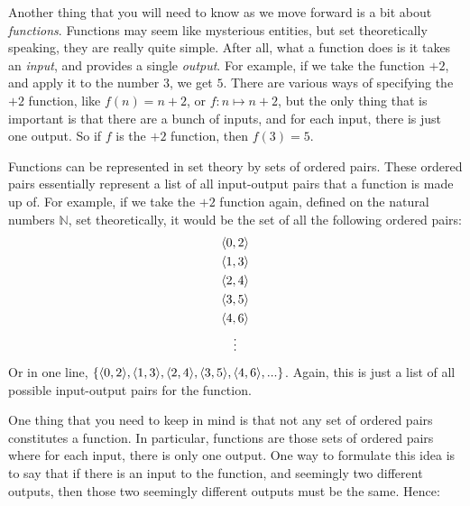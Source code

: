 Another thing that you will need to know as we move forward is a bit about \textit{functions}. Functions may seem like mysterious entities, but set theoretically speaking, they are really quite simple. After all, what a function does is it takes an \textit{input}, and provides a single \textit{output}. For example, if we take the function $+2$, and apply it to the number $3$, we get $5$. There are various ways of specifying the $+2$ function, like $f(n)=n+2$, or $f: n \mapsto n+2$, but the only thing that is important is that there are a bunch of inputs, and for each input, there is just one output. So if $f$ is the $+2$ function, then $f(3)=5$.
 

Functions can be represented in set theory by sets of ordered pairs. These ordered pairs essentially represent a list of all input-output pairs that a function is made up of. For example, if we take the $+2$ function again, defined on the natural numbers $\mathbb{N}$, set theoretically, it would be the set of all the following ordered pairs:
\begin{gather*}
	\langle0, 2\rangle\\
	\langle1, 3\rangle\\
	\langle2, 4\rangle\\
	\langle3, 5\rangle\\
	\langle4, 6\rangle\\
	\vdots
\end{gather*}
%
Or in one line, $\{\langle0, 2\rangle, \langle1, 3\rangle, \langle2, 4\rangle,	\langle3, 5\rangle, \langle4, 6\rangle, ...\}$. Again, this is just a list of all possible input-output pairs for the function. 


One thing that you need to keep in mind is that not any set of ordered pairs constitutes a function. In particular, functions are those sets of ordered pairs where for each input, there is only one output. One way to formulate this idea is to say that if there is an input to the function, and seemingly two different outputs, then those two seemingly different outputs must be the same. Hence:

